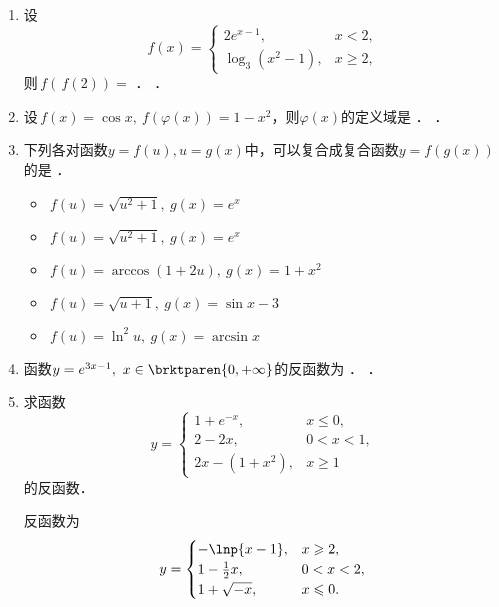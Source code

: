 \begin{enumerate}
\item 设
  \[
    f(x) =
    \begin{cases}
      2e^{x-1}, & x < 2, \\
      \log_3(x^2-1), & x \ge 2,
    \end{cases}
  \]
  则\(\,f(\,f(2)) =\)
  \ifshowsol
    \uline{}．
  \else
    \uline{\makebox[3em]{}}．
  \fi

\item 设\(\,f(x) = \cos x,\ f(\varphi(x)) = 1 - x^2\)，则\(\varphi(x)\)的定义域是
  \ifshowsol
    {\setlength{\ULdepth}{.8ex}%
      \uline{}}．
  \else
    \uline{\makebox[6em]{}}．
  \fi

\item 下列各对函数\(y = f(u), u = g(x)\)中，可以复合成复合函数\(y = f(g(x))\)的是
  \uline{\hfill}．
  \begin{itemize}
    \renewcommand{\labelitemi}{\faCircleThin}
    \ifshowsol
    \item[\faCircle] \(\,f(u) = \sqrt{u^2 + 1},\ g(x) = e^x\)
    \else
    \item \(\,f(u) = \sqrt{u^2 + 1},\ g(x) = e^x\)
    \fi
  \item \(\,f(u) = \arccos(1+2u),\ g(x) = 1 + x^2\)
  \item \(\,f(u) = \sqrt{u+1},\ g(x) = \sin x - 3\)
  \item \(\,f(u) = \ln^2 u,\ g(x) = \arcsin x\)
  \end{itemize}

\item 函数\(y = e^{3x-1},\ x \in \brktparen{0, +\infty}\)的反函数为
  \ifshowsol
    {\setlength{\ULdepth}{.85ex}%
      \uline{}}．
  \else
    \uline{\makebox[15em]{}}．
  \fi

\item 求函数
  \[
    y =
    \begin{cases}
      1 + e^{-x}, & x \le 0, \\
      2 - 2x, & 0 < x < 1, \\
      2x - (1+x^2), & x \ge 1
    \end{cases}
  \]
  的反函数．

  \ifshowsol
    反函数为
    \[
      y =
      \begin{cases}
        -\lnp{x-1}, & x \ge 2, \\
        1 - \frac12 x, & 0 < x < 2, \\
        1 + \sqrt{-x}, & x \le 0.
      \end{cases}
    \]
  \fi


\end{enumerate}
